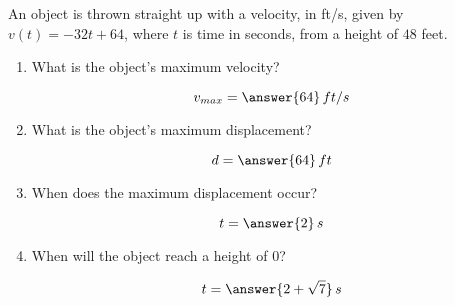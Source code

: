 \documentclass{ximera}
\author{Gregory Hartman \and Matthew Carr}
\begin{document}
\begin{exercise}



An object is thrown straight up with a velocity, in ft/s, given by
$v(t)=-32t+64$, where $t$ is time in seconds, from a height of $48$
feet.
\begin{enumerate}
\item What is the object's maximum velocity? \begin{prompt}\[v_{max}=\answer{64}\,ft/s\]\end{prompt}
\item What is the object's maximum displacement? \begin{prompt}\[d=\answer{64}\,ft\]\end{prompt}
\item When does the maximum displacement occur? \begin{prompt}\[t=\answer{2}\,s\]\end{prompt}
\item When will the object reach a height of $0$? \begin{prompt}\[t=\answer{2+\sqrt{7}}\,s\]\end{prompt}
\end{enumerate}

\end{exercise}
\end{document}
